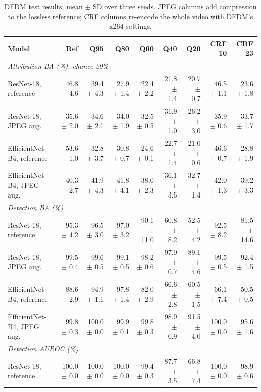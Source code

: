 \begin{table}[t]
\centering
\footnotesize
\caption{DFDM test results, mean $\pm$ SD over three seeds. JPEG columns add compression to the lossless reference; CRF columns re-encode the whole video with DFDM's x264 settings.}
\label{tab:dfdm-curves}
\setlength{\tabcolsep}{3.5pt}
\begin{tabular}{lrrrrrrrr}
\toprule
Model & Ref & Q95 & Q80 & Q60 & Q40 & Q20 & CRF 10 & CRF 23 \\
\midrule
\multicolumn{9}{l}{\textit{Attribution BA (\%), chance 20\%}} \\
ResNet-18, reference & 46.8 $\pm$ 4.6 & 39.4 $\pm$ 4.3 & 27.9 $\pm$ 1.4 & 22.4 $\pm$ 2.2 & 21.8 $\pm$ 1.4 & 20.7 $\pm$ 0.7 & 46.5 $\pm$ 1.1 & 23.6 $\pm$ 1.8 \\
ResNet-18, JPEG aug. & 35.6 $\pm$ 2.0 & 34.6 $\pm$ 2.1 & 34.0 $\pm$ 1.9 & 32.5 $\pm$ 0.5 & 31.9 $\pm$ 1.0 & 26.2 $\pm$ 3.0 & 35.9 $\pm$ 0.6 & 33.7 $\pm$ 1.7 \\
EfficientNet-B4, reference & 53.6 $\pm$ 1.0 & 32.8 $\pm$ 3.7 & 30.8 $\pm$ 0.7 & 24.6 $\pm$ 0.1 & 22.7 $\pm$ 1.4 & 21.0 $\pm$ 0.6 & 46.6 $\pm$ 0.7 & 28.8 $\pm$ 1.9 \\
EfficientNet-B4, JPEG aug. & 40.3 $\pm$ 2.7 & 41.9 $\pm$ 4.3 & 41.8 $\pm$ 4.1 & 38.0 $\pm$ 2.3 & 36.1 $\pm$ 3.5 & 32.7 $\pm$ 1.4 & 42.0 $\pm$ 1.3 & 39.2 $\pm$ 3.3 \\
\midrule
\multicolumn{9}{l}{\textit{Detection BA (\%)}} \\
ResNet-18, reference & 95.3 $\pm$ 4.2 & 96.5 $\pm$ 3.0 & 97.0 $\pm$ 3.2 & 90.1 $\pm$ 11.0 & 60.8 $\pm$ 8.2 & 52.5 $\pm$ 4.2 & 92.5 $\pm$ 8.2 & 81.5 $\pm$ 14.6 \\
ResNet-18, JPEG aug. & 99.5 $\pm$ 0.4 & 99.6 $\pm$ 0.5 & 99.1 $\pm$ 0.5 & 98.2 $\pm$ 0.6 & 97.0 $\pm$ 0.7 & 89.1 $\pm$ 4.6 & 99.5 $\pm$ 0.5 & 92.4 $\pm$ 1.5 \\
EfficientNet-B4, reference & 88.6 $\pm$ 2.9 & 94.9 $\pm$ 1.1 & 97.8 $\pm$ 1.4 & 82.0 $\pm$ 2.9 & 66.6 $\pm$ 2.8 & 60.5 $\pm$ 1.5 & 66.1 $\pm$ 7.4 & 50.5 $\pm$ 0.5 \\
EfficientNet-B4, JPEG aug. & 99.8 $\pm$ 0.3 & 100.0 $\pm$ 0.0 & 99.9 $\pm$ 0.1 & 99.8 $\pm$ 0.3 & 98.9 $\pm$ 0.9 & 91.5 $\pm$ 4.0 & 100.0 $\pm$ 0.0 & 95.6 $\pm$ 1.6 \\
\midrule
\multicolumn{9}{l}{\textit{Detection AUROC (\%)}} \\
ResNet-18, reference & 100.0 $\pm$ 0.0 & 100.0 $\pm$ 0.0 & 100.0 $\pm$ 0.0 & 99.4 $\pm$ 0.3 & 87.7 $\pm$ 3.5 & 66.8 $\pm$ 7.4 & 100.0 $\pm$ 0.0 & 98.9 $\pm$ 0.6 \\

\end{tabular}
\end{table}
